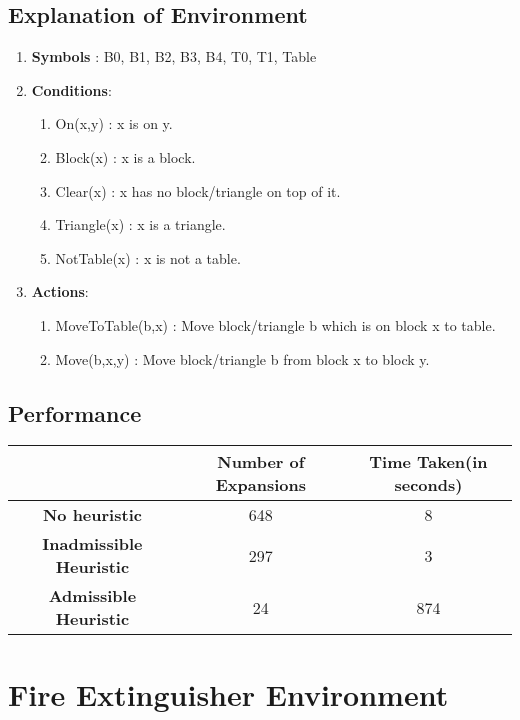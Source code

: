 \documentclass[12pt]{article}
\begin{document}
\subsection{Explanation of Environment}
\begin{enumerate}
    \item \textbf{Symbols} : B0, B1, B2, B3, B4, T0, T1, Table
    
    \item \textbf{Conditions}:
    \begin{enumerate}
        \item On(x,y) : x is on y.
        \item Block(x) : x is a block.
        \item Clear(x) : x has no block/triangle on top of it.
        \item Triangle(x) : x is a triangle.
        \item NotTable(x) : x is not a table.
        
    \end{enumerate}
    
    \item \textbf{Actions}:
    \begin{enumerate}
        \item MoveToTable(b,x) : Move block/triangle b which is on block x to table.
        \item Move(b,x,y) : Move block/triangle b from block x to block y.
    \end{enumerate}
\end{enumerate}

\subsection{Performance}
\begin{center}
\begin{tabular}{| c | c | c |}
\hline
  & \textbf{Number of Expansions} & \textbf{Time Taken(in seconds)} \\ 
 \hline
 \textbf{No heuristic} & 648 & 8 \\  
 \hline
 \textbf{Inadmissible Heuristic} & 297 & 3 \\   
 \hline
 \textbf{Admissible Heuristic} & 24 & 874 \\
\hline
\end{tabular}
\end{center}

\newpage
\section{Fire Extinguisher Environment}
\end{document}
